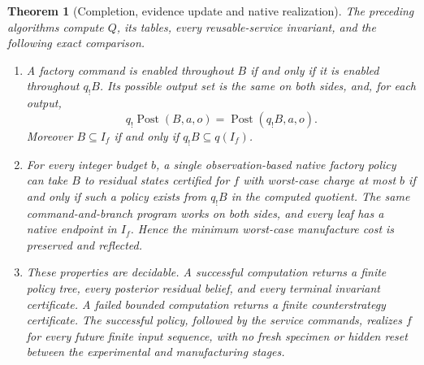 \documentclass[11pt]{article}
\newtheorem{theorem}{Theorem}[section]
\theoremstyle{definition}
\theoremstyle{remark}
\begin{document}
\begin{theorem}[Completion, evidence update and native realization]
\label{msc:thm:joint}
The preceding algorithms compute $Q$, its tables, every reusable-service
invariant, and the following exact comparison.
\begin{enumerate}
\item A factory command is enabled throughout $B$ if and only if it is
enabled throughout $q_!B$. Its possible output set is the same on both
sides, and, for each output,
\[
 q_!\operatorname{Post}(B,a,o)
     =\operatorname{Post}(q_!B,a,o).                 \tag{MC}
\]
Moreover $B\subseteq I_f$ if and only if $q_!B\subseteq q(I_f)$.
\item For every integer budget $b$, a single observation-based native
factory policy can take $B$ to residual states certified for $f$ with
worst-case charge at most $b$ if and only if such a policy exists from
$q_!B$ in the computed quotient. The same command-and-branch program works
on both sides, and every leaf has a native endpoint in $I_f$. Hence the
minimum worst-case manufacture cost is preserved and reflected.
\item These properties are decidable. A successful computation returns a
finite policy tree, every posterior residual belief, and every terminal
invariant certificate. A failed bounded computation returns a finite
counterstrategy certificate. The successful policy, followed by the
service commands, realizes $f$ for every future finite input sequence,
with no fresh specimen or hidden reset between the experimental and
manufacturing stages.
\end{enumerate}
\end{theorem}
\end{document}
